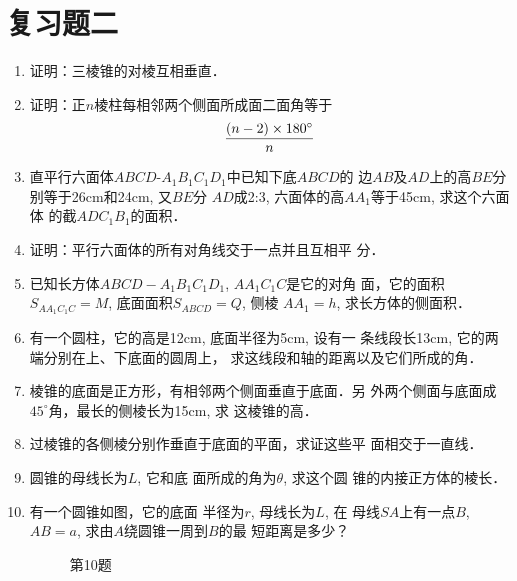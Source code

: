 \section*{复习题二}

\begin{enumerate}
    \item 证明：三棱锥的对棱互相垂直．
    \item 证明：正$n$棱柱每相邻两个侧面所成面二面角等于
\[\dfrac{(n-2)\times 180^{\circ}}{n}\]

\item 直平行六面体$ABCD$-$A_1B_1C_1D_1$中已知下底$ABCD$的
边$AB$及$AD$上的高$BE$分别等于26cm和24cm, 又$BE$分
$AD$成2:3, 六面体的高$AA_1$等于45cm, 求这个六面体
的截$ADC_1B_1$的面积．
\item 证明：平行六面体的所有对角线交于一点并且互相平
分．
\item 已知长方体$ABCD-A_1B_1C_1D_1$, $AA_1C_1C$是它的对角
面，它的面积$S_{AA_1C_1C}=M$, 底面面积$S_{ABCD}=Q$, 侧棱
$AA_1=h$, 求长方体的侧面积．
\item 有一个圆柱，它的高是12cm, 底面半径为5cm, 设有一
条线段长13cm, 它的两端分别在上、下底面的圆周上，
求这线段和轴的距离以及它们所成的角．
\item 
棱锥的底面是正方形，有相邻两个侧面垂直于底面．另
外两个侧面与底面成$45^{\circ}$角，最长的侧棱长为15cm, 求
这棱锥的高．
\item 过棱锥的各侧棱分别作垂直于底面的平面，求证这些平
面相交于一直线．
\item 圆锥的母线长为$L$, 它和底
面所成的角为$\theta$, 求这个圆
锥的内接正方体的棱长．
\item 有一个圆锥如图，它的底面
半径为$r$, 母线长为$L$, 在
母线$SA$上有一点$B$, $AB=a$,
求由$A$绕圆锥一周到$B$的最
短距离是多少？

\begin{figure}[htp]
    \centering
    \caption*{第10题}
\end{figure}


\end{enumerate}
